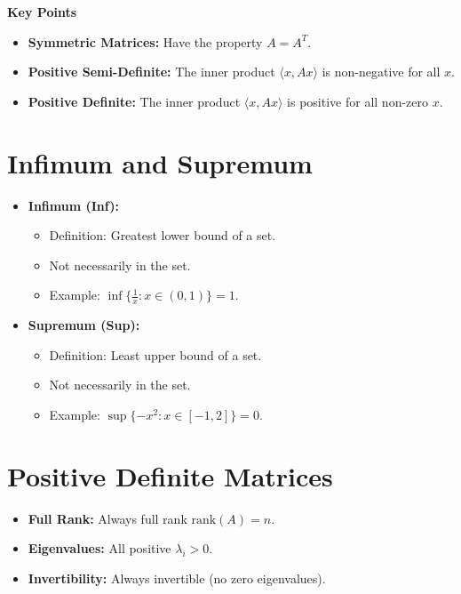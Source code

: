 \documentclass{article}
\begin{document}
\noindent\textbf{Key Points}
\begin{itemize}
    \item \textbf{Symmetric Matrices:} Have the property $A = A^T$.
    \item \textbf{Positive Semi-Definite:} The inner product $\langle x, Ax \rangle$ is non-negative for all $x$.
    \item \textbf{Positive Definite:} The inner product $\langle x, Ax \rangle$ is positive for all non-zero $x$.
\end{itemize}




\section*{Infimum and Supremum}

\begin{itemize}
    \item \textbf{Infimum (Inf):}
    \begin{itemize}
        \item Definition: Greatest lower bound of a set.
        \item Not necessarily in the set.
        \item Example: \( \inf \{ \frac{1}{x} : x \in (0, 1) \} = 1 \).
    \end{itemize}
    
    \item \textbf{Supremum (Sup):}
    \begin{itemize}
        \item Definition: Least upper bound of a set.
        \item Not necessarily in the set.
        \item Example: \( \sup \{ -x^2 : x \in [-1, 2] \} = 0 \).
    \end{itemize}
\end{itemize}












\section*{Positive Definite Matrices}
\begin{itemize}[leftmargin=*]
    \item \textbf{Full Rank:} Always full rank \(\text{rank}(A) = n\).
    \item \textbf{Eigenvalues:} All positive \(\lambda_i > 0\).
    \item \textbf{Invertibility:} Always invertible (no zero eigenvalues).
\end{itemize}
\end{document}
